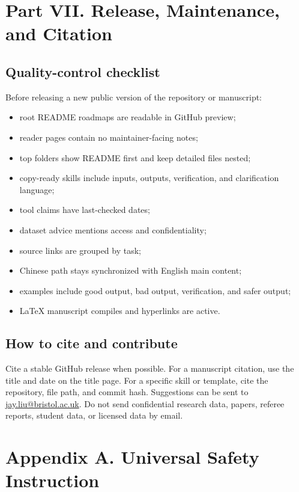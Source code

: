\documentclass[11pt]{article}
\makeatletter
\newcommand{\contact}{\href{mailto:jay.liu@bristol.ac.uk}{jay.liu@bristol.ac.uk}}
\makeatother
\begin{document}
\section{Part VII. Release, Maintenance, and Citation}

\subsection{Quality-control checklist}

Before releasing a new public version of the repository or manuscript:

\begin{itemize}[leftmargin=2em]
  \item root README roadmaps are readable in GitHub preview;
  \item reader pages contain no maintainer-facing notes;
  \item top folders show README first and keep detailed files nested;
  \item copy-ready skills include inputs, outputs, verification, and clarification language;
  \item tool claims have last-checked dates;
  \item dataset advice mentions access and confidentiality;
  \item source links are grouped by task;
  \item Chinese path stays synchronized with English main content;
  \item examples include good output, bad output, verification, and safer output;
  \item LaTeX manuscript compiles and hyperlinks are active.
\end{itemize}

\subsection{How to cite and contribute}

Cite a stable GitHub release when possible. For a manuscript citation, use the title and date on the title page. For a specific skill or template, cite the repository, file path, and commit hash. Suggestions can be sent to \contact. Do not send confidential research data, papers, referee reports, student data, or licensed data by email.

\newpage
\appendix

\section{Appendix A. Universal Safety Instruction}
\end{document}
